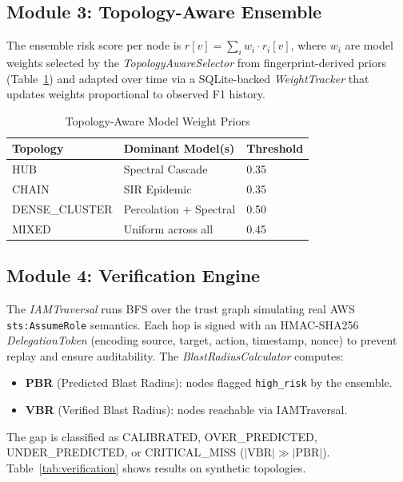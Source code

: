 \documentclass[conference,a4paper]{IEEEtran}
\begin{document}
\subsection{Module 3: Topology-Aware Ensemble}

The ensemble risk score per node is
$r[v] = \sum_i w_i \cdot r_i[v]$,
where $w_i$ are model weights selected by the
\textit{TopologyAwareSelector} from fingerprint-derived priors
(Table~\ref{tab:weights}) and adapted over time via a SQLite-backed
\textit{WeightTracker} that updates weights proportional to observed F1
history.

\begin{table}[h]
\centering
\caption{Topology-Aware Model Weight Priors}
\label{tab:weights}
\begin{tabular}{lll}
\toprule
\textbf{Topology} & \textbf{Dominant Model(s)} & \textbf{Threshold} \\
\midrule
HUB          & Spectral Cascade        & 0.35 \\
CHAIN        & SIR Epidemic            & 0.35 \\
DENSE\_CLUSTER & Percolation + Spectral & 0.50 \\
MIXED        & Uniform across all      & 0.45 \\
\bottomrule
\end{tabular}
\end{table}

\subsection{Module 4: Verification Engine}

The \textit{IAMTraversal} runs BFS over the trust graph simulating
real AWS \texttt{sts:AssumeRole} semantics.
Each hop is signed with an HMAC-SHA256 \textit{DelegationToken}
(encoding source, target, action, timestamp, nonce) to prevent replay
and ensure auditability.
The \textit{BlastRadiusCalculator} computes:
\begin{itemize}
  \item \textbf{PBR} (Predicted Blast Radius): nodes flagged
        \texttt{high\_risk} by the ensemble.
  \item \textbf{VBR} (Verified Blast Radius): nodes reachable via
        IAMTraversal.
\end{itemize}
The gap is classified as CALIBRATED, OVER\_PREDICTED, UNDER\_PREDICTED,
or CRITICAL\_MISS ($|\text{VBR}| \gg |\text{PBR}|$).
Table~\ref{tab:verification} shows results on synthetic topologies.
\end{document}
